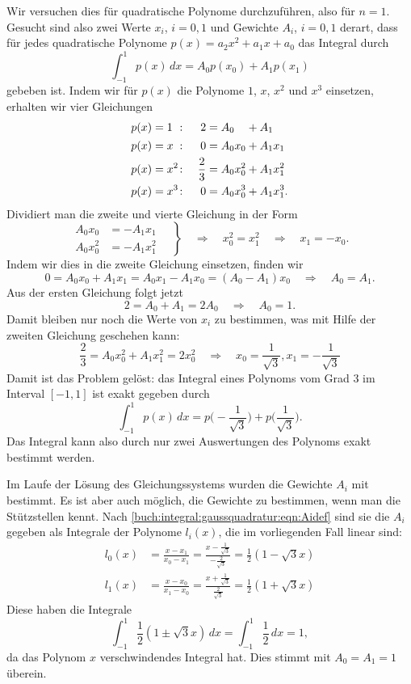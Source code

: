 \begin{beispiel}
Wir versuchen dies für quadratische Polynome durchzuführen, also 
für $n=1$.
Gesucht sind also zwei Werte $x_i$, $i=0,1$ und Gewichte $A_i$, $i=0,1$
derart, dass für jedes quadratische Polynome $p(x)=a_2x^2+a_1x+a_0$ 
das Integral durch
\[
\int_{-1}^1 p(x)\,dx
=
A_0 p(x_0) + A_1 p(x_1)
\]
gebeben ist.
Indem wir für $p(x)$ die Polynome $1$, $x$, $x^2$ und $x^3$ einsetzen,
erhalten wir vier Gleichungen
\[
\begin{aligned}
p(x)&=\rlap{$1$}\phantom{x^2}\colon& 2       &= A_0\phantom{x_0}+ A_1     \\
p(x)&=x^{\phantom{2}}\colon& 0       &= A_0x_0   + A_1x_1  \\
p(x)&=x^2\colon& \frac23 &= A_0x_0^2 + A_1x_1^2\\
p(x)&=x^3\colon& 0       &= A_0x_0^3 + A_1x_1^3.
\end{aligned}
\]
Dividiert man die zweite und vierte Gleichung in der Form
\[
\left.
\begin{aligned}
A_0x_0 &= -A_1x_1\\
A_0x_0^2 &= -A_1x_1^2
\end{aligned}
\quad
\right\}
\quad
\Rightarrow
\quad
x_0^2=x_1^2
\quad
\Rightarrow
\quad
x_1=-x_0.
\]
Indem wir dies in die zweite Gleichung einsetzen, finden wir 
\[
0 = A_0x_0 + A_1x_1 = A_0x_1 -A_1x_0 = (A_0-A_1)x_0
\quad\Rightarrow\quad
A_0=A_1.
\]
Aus der ersten Gleichung folgt jetzt
\[
2= A_0+A_1 = 2A_0 \quad\Rightarrow\quad A_0 = 1.
\]
Damit bleiben nur noch die Werte von $x_i$ zu bestimmen, was 
mit Hilfe der zweiten Gleichung geschehen kann:
\[
\frac23 = A_0x_0^2 + A_1x_1^2 = 2x_0^2
\quad\Rightarrow\quad
x_0 = \frac{1}{\sqrt{3}}, x_1 = -\frac{1}{\sqrt{3}}
\]
Damit ist das Problem gelöst: das Integral eines Polynoms vom Grad 3
im Interval $[-1,1]$ ist exakt gegeben durch
\[
\int_{-1}^1 p(x)\,dx
=
p\biggl(-\frac{1}{\sqrt{3}}\biggr)
+
p\biggl(\frac{1}{\sqrt{3}}\biggr).
\]
Das Integral kann also durch nur zwei Auswertungen des Polynoms
exakt bestimmt werden.

Im Laufe der Lösung des Gleichungssystems wurden die Gewichte $A_i$
mit bestimmt.
Es ist aber auch möglich, die Gewichte zu bestimmen, wenn man die
Stützstellen kennt.
Nach \eqref{buch:integral:gaussquadratur:eqn:Aidef}
sind sie die $A_i$ gegeben als Integrale der Polynome
$l_i(x)$, die im vorliegenden Fall linear sind:
\begin{align*}
l_0(x)
&=
\frac{x-x_1}{x_0-x_1}
=
\frac{x-\frac1{\sqrt{3}}}{-\frac{2}{\sqrt{3}}}
=
\frac12(1-\sqrt{3}x)
\\
l_1(x)
&=
\frac{x-x_0}{x_1-x_0}
=
\frac{x+\frac1{\sqrt{3}}}{\frac{2}{\sqrt{3}}}
=
\frac12(1+\sqrt{3}x)
\end{align*}
Diese haben die Integrale
\[
\int_{-1}^1\frac12(1\pm\sqrt{3}x)\,dx
=
\int_{-1}^1 \frac12\,dx
=
1,
\]
da das Polynom $x$ verschwindendes Integral hat.
Dies stimmt mit $A_0=A_1=1$ überein.
\label{buch:integral:beispiel:gaussquadraturn1}
\end{beispiel}

